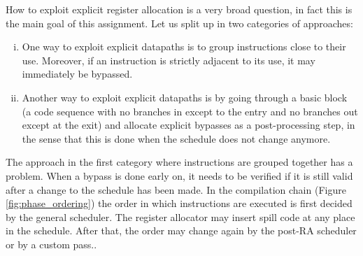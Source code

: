 How to exploit explicit register allocation is a very broad question, in fact this is the main goal of this assignment. Let us split up in two categories of approaches:
\begin{enumerate}[i.]
  \item One way to exploit explicit datapaths is to group instructions close to their use. Moreover, if an instruction is strictly adjacent to its use, it may immediately be bypassed.%
  \item Another way to exploit explicit datapaths is by going through a basic block (a code sequence with no branches in except to the entry and no branches out except at the exit) and allocate explicit bypasses as a post-processing step, in the sense that this is done when the schedule does not change anymore.
\end{enumerate}

The approach in the first category where instructions are grouped together has a problem. When a bypass is done early on, it needs to be verified if it is still valid after a change to the schedule has been made. In the compilation chain (Figure \ref{fig:phase_ordering}) the order in which instructions are executed is first decided by the general scheduler. The register allocator may insert spill code at any place in the schedule. After that, the order may change again by the post-RA scheduler or by a custom pass..


